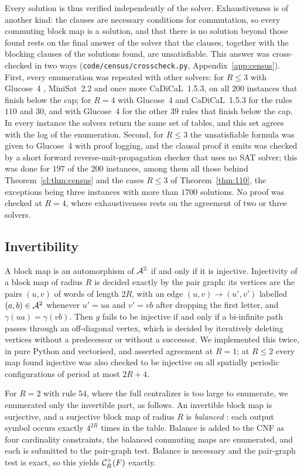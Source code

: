 Every solution is thus verified independently of the solver. Exhaustiveness is of another kind: the clauses are necessary conditions for commutation, so every commuting block map is a solution, and that there is no solution beyond those found rests on the final answer of the solver that the clauses, together with the blocking clauses of the solutions found, are unsatisfiable. This answer was cross-checked in two ways (\texttt{code/census/crosscheck.py}, Appendix~\ref{app:census}). First, every enumeration was repeated with other solvers: for $R\le3$ with Glucose~4 \cite{Glucose}, MiniSat~2.2 and once more CaDiCaL~1.5.3, on all $200$ instances that finish below the cap; for $R=4$ with Glucose~4 and CaDiCaL~1.5.3 for the rules $110$ and $30$, and with Glucose~4 for the other $39$ rules that finish below the cap. In every instance the solvers return the same set of tables, and this set agrees with the log of the enumeration. Second, for $R\le3$ the unsatisfiable formula was given to Glucose~4 with proof logging, and the clausal proof it emits was checked by a short forward reverse-unit-propagation checker that uses no SAT solver; this was done for $197$ of the $200$ instances, among them all those behind Theorem~\ref{cl:thm:census} and the cases $R\le3$ of Theorem~\ref{thm:110}, the exceptions being three instances with more than $1700$ solutions. No proof was checked at $R=4$, where exhaustiveness rests on the agreement of two or three solvers.

\subsection{Invertibility}
A block map is an automorphism of $\mathcal{A}^{\mathbb{Z}}$ if and only if it is injective. Injectivity of a block map of radius $R$ is decided exactly by the pair graph: its vertices are the pairs $(u,v)$ of words of length $2R$, with an edge $(u,v)\to(u',v')$ labelled $(a,b)\in\mathcal{A}^2$ whenever $u'=ua$ and $v'=vb$ after dropping the first letter, and $\gamma(ua)=\gamma(vb)$. Then $g$ fails to be injective if and only if a bi-infinite path passes through an off-diagonal vertex, which is decided by iteratively deleting vertices without a predecessor or without a successor. We implemented this twice, in pure Python and vectorised, and asserted agreement at $R=1$; at $R\le2$ every map found injective was also checked to be injective on all spatially periodic configurations of period at most $2R+4$.

For $R=2$ with rule $54$, where the full centralizer is too large to enumerate, we enumerated only the invertible part, as follows. An invertible block map is surjective, and a surjective block map of radius $R$ is \emph{balanced} \cite[Theorem~5.4]{Hedlund1969}: each output symbol occurs exactly $4^{2R}$ times in the table. Balance is added to the CNF as four cardinality constraints, the balanced commuting maps are enumerated, and each is submitted to the pair-graph test. Balance is necessary and the pair-graph test is exact, so this yields $\mathcal{C}^{\times}_R(F)$ exactly.

